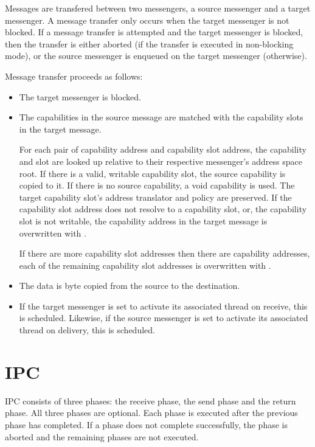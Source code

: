 \label{message-transfer}

Messages are transfered between two messengers, a source messenger and
a target messenger.  A message transfer only occurs when the target
messenger is not blocked.  If a message transfer is attempted and the
target messenger is blocked, then the transfer is either aborted (if
the transfer is executed in non-blocking mode), or the source
messenger is enqueued on the target messenger (otherwise).

Message transfer proceeds as follows:

\begin{itemize}
\item The target messenger is blocked.

\item The capabilities in the source message are matched with the
  capability slots in the target message.

  For each pair of capability address and capability slot address, the
  capability and slot are looked up relative to their respective
  messenger's address space root.  If there is a valid, writable
  capability slot, the source capability is copied to it.  If there is
  no source capability, a void capability is used.  The target
  capability slot's address translator and policy are preserved.  If
  the capability slot address does not resolve to a capability slot,
  or, the capability slot is not writable, the capability address in
  the target message is overwritten with .

  If there are more capability slot addresses then there are
  capability addresses, each of the remaining capability slot
  addresses is overwritten with .

\item The data is byte copied from the source to the destination.

\item If the target messenger is set to activate its associated thread
  on receive, this is scheduled.  Likewise, if the source messenger is
  set to activate its associated thread on delivery, this is
  scheduled.
\end{itemize}

\section{IPC}

IPC consists of three phases: the receive phase, the send phase and
the return phase.  All three phases are optional.  Each phase is
executed after the previous phase has completed.  If a phase does not
complete successfully, the phase is aborted and the remaining phases
are not executed.

